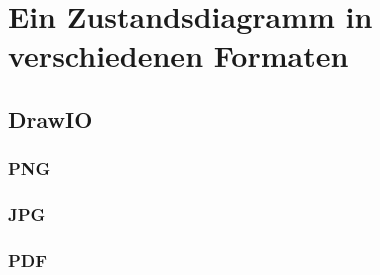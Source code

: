 \documentclass[11pt]{scrartcl}
\begin{document}
\newpage
\section{Ein Zustandsdiagramm in verschiedenen Formaten}

\subsection{DrawIO}

\subsubsection{PNG}

\begin{figure}[htbp]
   \centering
   \setlength{\fboxsep}{5pt}
   \setlength{\fboxrule}{2pt}
\end{figure}

\subsubsection{JPG}

\begin{figure}[htbp]
   \centering
   \setlength{\fboxsep}{5pt}
   \setlength{\fboxrule}{2pt}
\end{figure}

\subsubsection{PDF}
\end{document}
